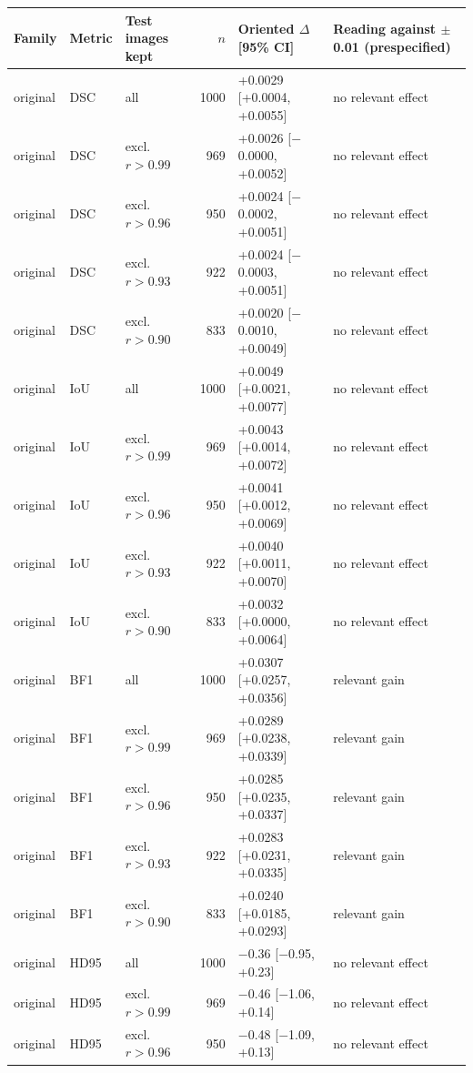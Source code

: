 \begin{tabular}{lllrll}
\toprule
Family & Metric & Test images kept & $n$ & Oriented $\Delta$ [95\% CI] & Reading against $\pm$0.01 (prespecified) \\
\midrule
original & DSC & all & 1000 & +0.0029 [+0.0004, +0.0055] & no relevant effect \\
original & DSC & excl. $r>0.99$ & 969 & +0.0026 [$-$0.0000, +0.0052] & no relevant effect \\
original & DSC & excl. $r>0.96$ & 950 & +0.0024 [$-$0.0002, +0.0051] & no relevant effect \\
original & DSC & excl. $r>0.93$ & 922 & +0.0024 [$-$0.0003, +0.0051] & no relevant effect \\
original & DSC & excl. $r>0.90$ & 833 & +0.0020 [$-$0.0010, +0.0049] & no relevant effect \\
original & IoU & all & 1000 & +0.0049 [+0.0021, +0.0077] & no relevant effect \\
original & IoU & excl. $r>0.99$ & 969 & +0.0043 [+0.0014, +0.0072] & no relevant effect \\
original & IoU & excl. $r>0.96$ & 950 & +0.0041 [+0.0012, +0.0069] & no relevant effect \\
original & IoU & excl. $r>0.93$ & 922 & +0.0040 [+0.0011, +0.0070] & no relevant effect \\
original & IoU & excl. $r>0.90$ & 833 & +0.0032 [+0.0000, +0.0064] & no relevant effect \\
original & BF1 & all & 1000 & +0.0307 [+0.0257, +0.0356] & relevant gain \\
original & BF1 & excl. $r>0.99$ & 969 & +0.0289 [+0.0238, +0.0339] & relevant gain \\
original & BF1 & excl. $r>0.96$ & 950 & +0.0285 [+0.0235, +0.0337] & relevant gain \\
original & BF1 & excl. $r>0.93$ & 922 & +0.0283 [+0.0231, +0.0335] & relevant gain \\
original & BF1 & excl. $r>0.90$ & 833 & +0.0240 [+0.0185, +0.0293] & relevant gain \\
original & HD95 & all & 1000 & $-$0.36 [$-$0.95, +0.23] & no relevant effect \\
original & HD95 & excl. $r>0.99$ & 969 & $-$0.46 [$-$1.06, +0.14] & no relevant effect \\
original & HD95 & excl. $r>0.96$ & 950 & $-$0.48 [$-$1.09, +0.13] & no relevant effect \\

\end{tabular}
